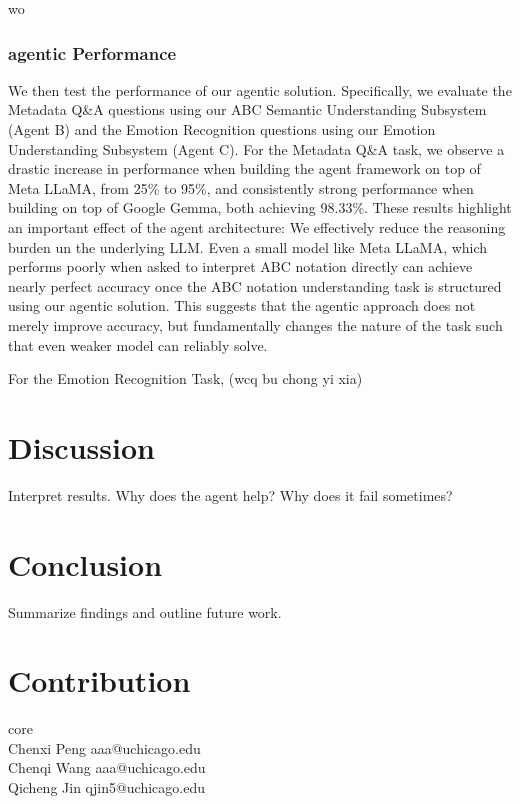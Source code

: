 wo\documentclass[sigconf]{acmart}
\begin{document}
\subsubsection{agentic Performance}
  We then test the performance of our agentic solution. Specifically, we evaluate the Metadata Q&A questions using our ABC Semantic Understanding Subsystem (Agent B) and the Emotion Recognition questions using our Emotion Understanding Subsystem (Agent C). For the Metadata Q&A task, we observe a drastic increase in performance when building the agent framework on top of Meta LLaMA, from 25\% to 95\%, and consistently strong performance when building on top of Google Gemma, both achieving 98.33\%. These results highlight an important effect of the agent architecture: We effectively reduce the reasoning burden un the underlying LLM. Even a small model like Meta LLaMA, which performs poorly when asked to interpret ABC notation directly can achieve nearly perfect accuracy once the ABC notation understanding task is structured using our agentic solution. This suggests that the agentic approach does not merely improve accuracy, but fundamentally changes the nature of the task such that even weaker model can reliably solve.    
 

For the Emotion Recognition Task, (wcq bu chong yi xia)

 





\section{Discussion}
Interpret results. Why does the agent help? Why does it fail sometimes?


\section{Conclusion}
Summarize findings and outline future work.


\section{Contribution}
core\\
Chenxi Peng aaa@uchicago.edu\\
Chenqi Wang aaa@uchicago.edu\\
Qicheng Jin qjin5@uchicago.edu\\




\end{document}
